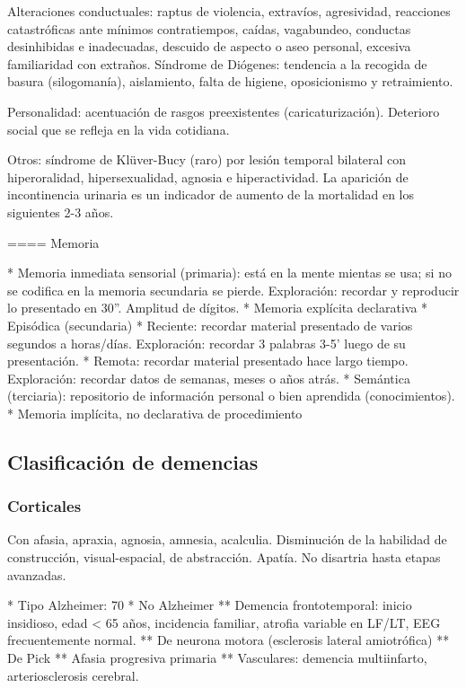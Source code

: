 Alteraciones conductuales: raptus de violencia, extravíos, agresividad, reacciones catastróficas ante mínimos contratiempos, caídas, vagabundeo, conductas desinhibidas e inadecuadas, descuido de aspecto o aseo personal, excesiva familiaridad con extraños. Síndrome de Diógenes: tendencia a la recogida de basura (silogomanía), aislamiento, falta de higiene, oposicionismo y retraimiento.

Personalidad: acentuación de rasgos preexistentes (caricaturización). Deterioro social que se refleja en la vida cotidiana.

Otros: síndrome de Klüver-Bucy (raro) por lesión temporal bilateral con hiperoralidad, hipersexualidad, agnosia e hiperactividad. La aparición de incontinencia urinaria es un indicador de aumento de la mortalidad en los siguientes 2-3 años.

==== Memoria

* Memoria inmediata sensorial (primaria): está en la mente mientas se usa; si no se codifica en la memoria secundaria se pierde. Exploración: recordar y reproducir lo presentado en 30”. Amplitud de dígitos.
* Memoria explícita declarativa
* Episódica (secundaria)
* Reciente: recordar material presentado de varios segundos a horas/días. Exploración: recordar 3 palabras 3-5’ luego de su presentación.
* Remota: recordar material presentado hace largo tiempo. Exploración: recordar datos de semanas, meses o años atrás.
* Semántica (terciaria): repositorio de información personal o bien aprendida (conocimientos).
* Memoria implícita, no declarativa de procedimiento

\subsection*{Clasificación de demencias}
\subsubsection*{Corticales}
Con afasia, apraxia, agnosia, amnesia, acalculia. Disminución de la habilidad de construcción, visual-espacial, de abstracción. Apatía. No disartria hasta etapas avanzadas.

* Tipo Alzheimer: 70%
* No Alzheimer
** Demencia frontotemporal: inicio insidioso, edad < 65 años, incidencia familiar, atrofia variable en LF/LT, EEG frecuentemente normal.
** De neurona motora (esclerosis lateral amiotrófica)
** De Pick
** Afasia progresiva primaria
** Vasculares: demencia multiinfarto, arteriosclerosis cerebral.

